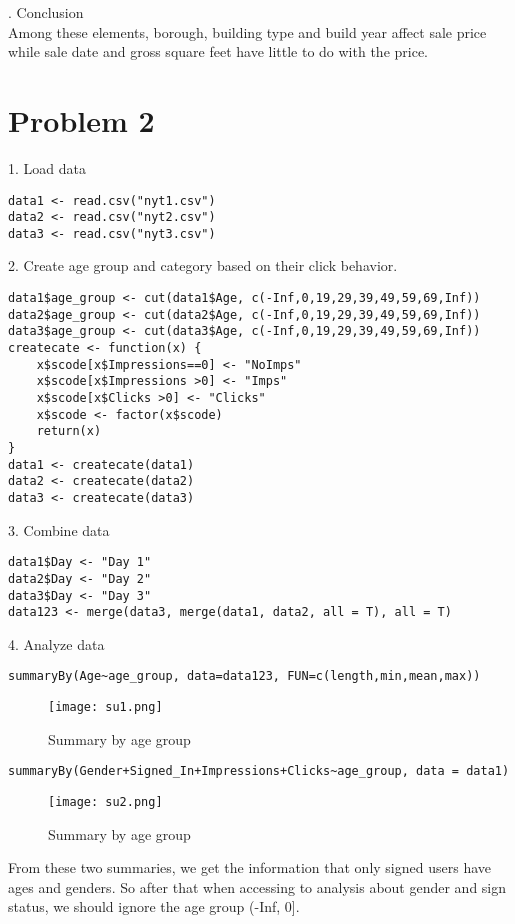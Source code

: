 \documentclass{article}
\begin{document}
. Conclusion \\
Among these elements, borough, building type and build year affect sale price while sale date and gross square feet have little to do with the price. \\

\section*{Problem 2}
1. Load data
\begin{verbatim}
data1 <- read.csv("nyt1.csv")
data2 <- read.csv("nyt2.csv")
data3 <- read.csv("nyt3.csv")
\end{verbatim}
2. Create age group and category based on their click behavior.
\begin{verbatim}
data1$age_group <- cut(data1$Age, c(-Inf,0,19,29,39,49,59,69,Inf))
data2$age_group <- cut(data2$Age, c(-Inf,0,19,29,39,49,59,69,Inf))
data3$age_group <- cut(data3$Age, c(-Inf,0,19,29,39,49,59,69,Inf))
createcate <- function(x) {
    x$scode[x$Impressions==0] <- "NoImps"
    x$scode[x$Impressions >0] <- "Imps"
    x$scode[x$Clicks >0] <- "Clicks"
    x$scode <- factor(x$scode)
    return(x)
}
data1 <- createcate(data1)
data2 <- createcate(data2)
data3 <- createcate(data3)
\end{verbatim}
3. Combine data
\begin{verbatim}
data1$Day <- "Day 1"
data2$Day <- "Day 2"
data3$Day <- "Day 3"
data123 <- merge(data3, merge(data1, data2, all = T), all = T)
\end{verbatim}
4. Analyze data
\begin{verbatim}
summaryBy(Age~age_group, data=data123, FUN=c(length,min,mean,max))
\end{verbatim}
\begin{figure}[H] 
\begin{center} 
\texttt{[image: su1.png]}  
\caption{Summary by age group} 
\end{center} 
\end{figure}
\begin{verbatim}
summaryBy(Gender+Signed_In+Impressions+Clicks~age_group, data = data1)
\end{verbatim}
\begin{figure}[H] 
\begin{center} 
\texttt{[image: su2.png]}  
\caption{Summary by age group} 
\end{center} 
\end{figure}
From these two summaries, we get the information that only signed users have ages and genders. So after that when accessing to analysis about gender and sign status, we should ignore the age group (-Inf, 0]. \\ 
\end{document}

